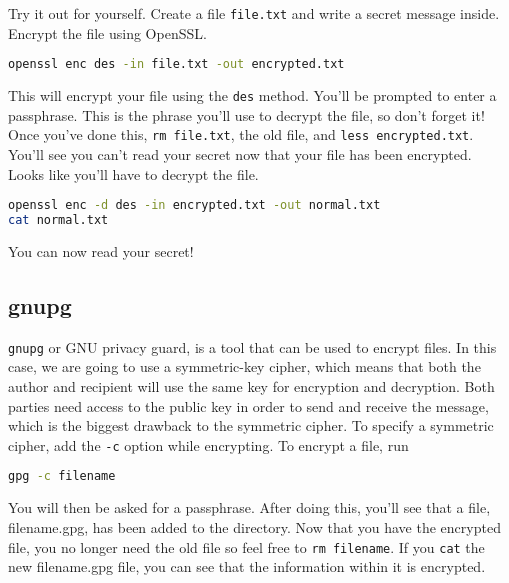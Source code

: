 \documentclass[11pt,a4paper]{article}
\begin{document}
Try it out for yourself. Create a file \verb|file.txt| and write a secret message inside. Encrypt the file using OpenSSL. 


\begin{lstlisting}[basicstyle=\ttfamily, backgroundcolor = \color{lightgray}, language = bash, xleftmargin = 0cm, framexleftmargin = 1em]
openssl enc des -in file.txt -out encrypted.txt
\end{lstlisting}

This will encrypt your file using the \verb|des| method. You'll be prompted to enter a passphrase. This is the phrase you'll use to decrypt the file, so don't forget it! Once you've done this, \verb|rm file.txt|, the old file, and \verb|less encrypted.txt|. You'll see you can't read your secret now that your file has been encrypted. Looks like you'll have to decrypt the file.  

\begin{lstlisting}[basicstyle=\ttfamily, backgroundcolor = \color{lightgray}, language = bash, xleftmargin = 0cm, framexleftmargin = 1em]
openssl enc -d des -in encrypted.txt -out normal.txt
cat normal.txt
\end{lstlisting}

You can now read your secret! 


\subsection*{gnupg}
\verb|gnupg| or GNU privacy guard, is a tool that can be used to encrypt files. In this case, we are going to use a symmetric-key cipher, which means that both the author and recipient will use the same key for encryption and decryption. Both parties need access to the public key in order to send and receive the message, which is the biggest drawback to the symmetric cipher. To specify a symmetric cipher, add the \verb|-c| option while encrypting. To encrypt a file, run 

\begin{lstlisting}[basicstyle=\ttfamily, backgroundcolor = \color{lightgray}, language = bash, xleftmargin = 0cm, framexleftmargin = 1em]
gpg -c filename
\end{lstlisting}

You will then be asked for a passphrase. After doing this, you'll see that a file, filename.gpg, has been added to the directory. Now that you have the encrypted file, you no longer need the old file so feel free to \verb|rm filename|. If you \verb|cat| the new filename.gpg file, you can see that the information within it is encrypted. 
\end{document}
